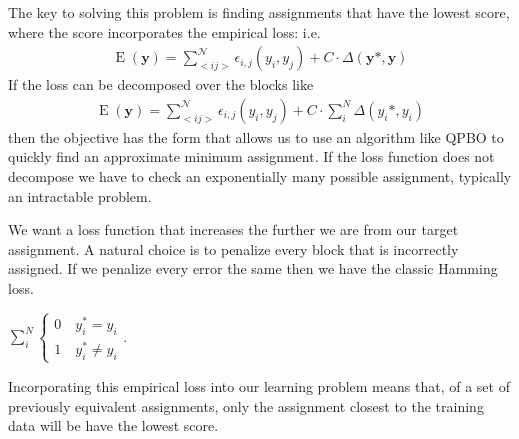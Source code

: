 The key to solving this problem is finding assignments that have the
lowest score, where the score incorporates the empirical loss: i.e.
%
\begin{align}
\operatorname{E}(\mathbf{y}) = \sum_{<i j>}^{\mathcal{N}}\epsilon_{i,j}(y_i,y_j) + C\cdot\Delta(\mathbf{y}*,
\mathbf{y})
\end{align}
%
If the loss can be decomposed over the blocks like
%
\begin{align}
\operatorname{E}(\mathbf{y}) = \sum_{<i j>}^{\mathcal{N}}\epsilon_{i,j}(y_i,y_j) + C\cdot\sum_i^N\Delta(y_i*, y_i)
\end{align}
%
then the objective has the form that allows us to use an algorithm
like QPBO to quickly find an approximate minimum assignment. If the
loss function does not decompose we have to check an exponentially
many possible assignment, typically an intractable problem.

We want a loss function that increases the further we are from our
target assignment. A natural choice is to penalize every block that is
incorrectly assigned. If we penalize every error the same then we have
the classic Hamming loss. 

$\sum_i^N\begin{cases}
  0 \quad y_i^* = y_i \\
  1 \quad y_i^* \neq y_i
\end{cases}$. 

Incorporating this empirical loss into our learning problem means
that, of a set of previously equivalent assignments, only the
assignment closest to the training data will be have the lowest score.
